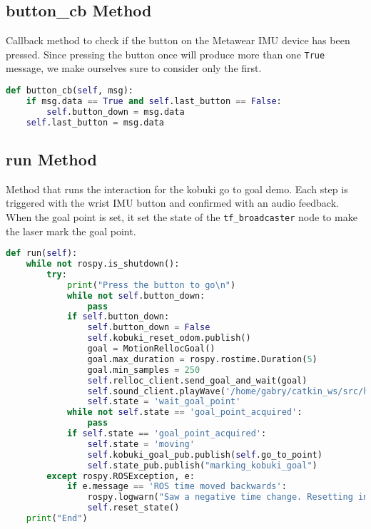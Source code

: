 \subsection*{button\_cb Method}
Callback method to check if the button on the Metawear IMU device has been pressed. Since pressing the button once will produce more than one \texttt{True} message, we make ourselves sure to consider only the first.
\begin{lstlisting}[caption={Button Callback},label={lst:buttoncb},language=Python]
def button_cb(self, msg):
    if msg.data == True and self.last_button == False:
        self.button_down = msg.data
    self.last_button = msg.data
\end{lstlisting}

\subsection*{run Method}
Method that runs the interaction for the kobuki go to goal demo. Each step is triggered with the wrist IMU button and confirmed with an audio feedback. When the goal point is set, it set the state of the \texttt{tf\_broadcaster} node to make the laser mark the goal point.
\begin{lstlisting}[caption={Run Kobuki Go To Goal},label={lst:runkgtg},language=Python]
def run(self):
    while not rospy.is_shutdown():
        try:
            print("Press the button to go\n")
            while not self.button_down:
                pass
            if self.button_down:
                self.button_down = False
                self.kobuki_reset_odom.publish()
                goal = MotionRellocGoal()
                goal.max_duration = rospy.rostime.Duration(5) 
                goal.min_samples = 250
                self.relloc_client.send_goal_and_wait(goal)
                self.sound_client.playWave('/home/gabry/catkin_ws/src/hmri_pt_laser/nodes/sounds/beep.wav')
                self.state = 'wait_goal_point'
            while not self.state == 'goal_point_acquired':
                pass
            if self.state == 'goal_point_acquired':                     self.sound_client.playWave('/home/gabry/catkin_ws/src/    hmri_pt_laser/nodes/sounds/beep.wav')
                self.state = 'moving'
                self.kobuki_goal_pub.publish(self.go_to_point)
                self.state_pub.publish("marking_kobuki_goal")
        except rospy.ROSException, e:
            if e.message == 'ROS time moved backwards':
                rospy.logwarn("Saw a negative time change. Resetting internal state...")
                self.reset_state()
    print("End")
\end{lstlisting}
